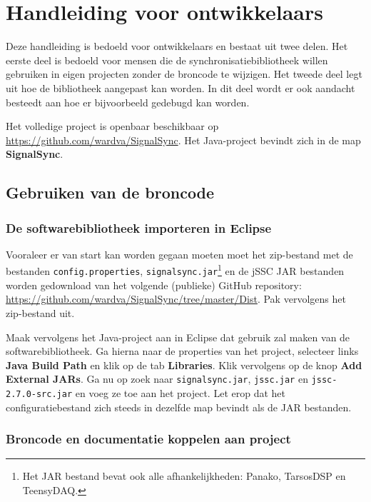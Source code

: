 \chapter{Handleiding voor ontwikkelaars}
\label{appendix-e}

Deze handleiding is bedoeld voor ontwikkelaars en bestaat uit twee delen. Het eerste deel is bedoeld voor mensen die de synchronisatiebibliotheek willen gebruiken in eigen projecten zonder de broncode te wijzigen. Het tweede deel legt uit hoe de bibliotheek aangepast kan worden. In dit deel wordt er ook aandacht besteedt aan hoe er bijvoorbeeld gedebugd kan worden.

Het volledige project is openbaar beschikbaar op \url{https://github.com/wardva/SignalSync}. Het Java-project bevindt zich in de map \textbf{SignalSync}.

\section{Gebruiken van de broncode}

\subsection*{De softwarebibliotheek importeren in Eclipse}

Vooraleer er van start kan worden gegaan moeten moet het zip-bestand met de bestanden \texttt{config.properties}, \texttt{signalsync.jar}\footnote{Het JAR bestand bevat ook alle afhankelijkheden: Panako\cite{six2014panako}, TarsosDSP\cite{six2014tarsosdsp} en TeensyDAQ.} en de jSSC JAR bestanden worden gedownload van het volgende (publieke) GitHub repository: \url{https://github.com/wardva/SignalSync/tree/master/Dist}. Pak vervolgens het zip-bestand uit.

Maak vervolgens het Java-project aan in Eclipse dat gebruik zal maken van de softwarebibliotheek. Ga hierna naar de properties van het project, selecteer links \textbf{Java Build Path} en klik op de tab \textbf{Libraries}. Klik vervolgens op de knop \textbf{Add External JARs}. Ga nu op zoek naar \texttt{signalsync.jar}, \texttt{jssc.jar} en \texttt{jssc-2.7.0-src.jar} en voeg ze toe aan het project. Let erop dat het configuratiebestand zich steeds in dezelfde map bevindt als de JAR bestanden.

\subsection*{Broncode en documentatie koppelen aan project}


